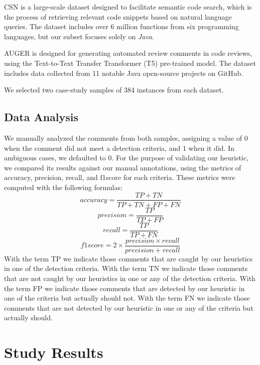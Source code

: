 \noindent CSN is a large-scale dataset designed to facilitate semantic code search, which is the process of retrieving relevant code snippets based on natural language queries.
The dataset includes over 6 million functions from six programming languages, but our subset focuses solely on \textit{Java}.

\noindent AUGER is designed for generating automated review comments in code reviews, using the Text-to-Text Transfer Transformer (T5) pre-trained model. The dataset includes data collected from 11 notable Java open-source projects on GitHub.

\noindent We selected two case-study samples of 384 instances from each dataset.

\subsection{Data Analysis}
We manually analyzed the comments from both samples, assigning a value of 0 when the comment did not meet a detection criteria, and 1 when it did. In ambiguous cases, we defaulted to 0. 
For the purpose of validating our heuristic, we compared its results against our manual annotations, using the metrics of accuracy, precision, recall, and f1score for each criteria. These metrics were computed with the following formulas:
\begin{equation*}
	accuracy = \frac{TP + TN}{TP + TN + FP + FN}		
\end{equation*}
\begin{equation*}
	precision = \frac{TP}{TP + FP}
\end{equation*}
\begin{equation*}
	recall = \frac{TP}{TP + FN}
\end{equation*}
\begin{equation*}
	f1score = 2 \times \frac{precision \times recall}{precision + recall}
\end{equation*}
With the term TP we indicate those comments that are caught by our heuristics in one of the detection criteria. With the term TN we indicate those comments that are not caught by our heuristics in one or any of the detection criteria. With the term FP we indicate those comments that are detected by our heuristic in one of the criteria but actually should not. With the term FN we indicate those comments that are not detected by our heuristic in one or any of the criteria but actually should.

\newpage

\section{Study Results}

